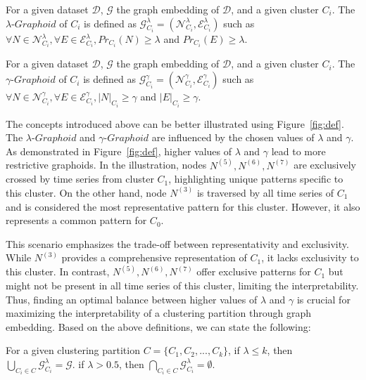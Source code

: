 \begin{definition}   
For a given dataset $\mathcal{D}$, $\mathcal{G}$ the graph embedding of $\mathcal{D}$, and a given cluster $C_i$. The $\lambda$-$Graphoid$ of $C_i$ is defined as $\mathcal{G}^{\lambda}_{C_i} = (\mathcal{N}^{\lambda}_{C_i},\mathcal{E}^{\lambda}_{C_i})$ such as $\forall N \in \mathcal{N}^{\lambda}_{C_i}, \forall E \in \mathcal{E}^{\lambda}_{C_i}, Pr_{C_i}(N) \geq \lambda$ and $Pr_{C_i}(E) \geq \lambda$.
\label{deflambdaGraph}  
\end{definition}

\begin{definition}   
For a given dataset $\mathcal{D}$, $\mathcal{G}$ the graph embedding of $\mathcal{D}$, and a given cluster $C_i$. The $\gamma$-$Graphoid$ of $C_i$ is defined as $\mathcal{G}^{\gamma}_{C_i} = (\mathcal{N}^{\gamma}_{C_i},\mathcal{E}^{\gamma}_{C_i})$ such as $\forall N \in \mathcal{N}^{\gamma}_{C_i}, \forall E \in \mathcal{E}^{\gamma}_{C_i}, |N|_{C_i} \geq \gamma$ and $|E|_{C_i} \geq \gamma$.
\label{defgammaGraph}  
\end{definition}

The concepts introduced above can be better illustrated using Figure~\ref{fig:def}. The $\lambda$-$Graphoid$ and $\gamma$-$Graphoid$ are influenced by the chosen values of $\lambda$ and $\gamma$. As demonstrated in Figure~\ref{fig:def}, higher values of $\lambda$ and $\gamma$ lead to more restrictive graphoids. In the illustration, nodes $N^{(5)},N^{(6)},N^{(7)}$ are exclusively crossed by time series from cluster $C_1$, highlighting unique patterns specific to this cluster. On the other hand, node $N^{(3)}$ is traversed by all time series of $C_1$ and is considered the most representative pattern for this cluster. However, it also represents a common pattern for $C_0$.

This scenario emphasizes the trade-off between representativity and exclusivity. While $N^{(3)}$ provides a comprehensive representation of $C_1$, it lacks exclusivity to this cluster. In contrast, $N^{(5)}, N^{(6)}, N^{(7)}$ offer exclusive patterns for $C_1$ but might not be present in all time series of this cluster, limiting the interpretability. Thus, finding an optimal balance between higher values of $\lambda$ and $\gamma$ is crucial for maximizing the interpretability of a clustering partition through graph embedding.
Based on the above definitions, we can state the following:

\begin{lemma}
    For a given clustering partition $C = \{C_1,C_2,...,C_k\}$, if $\lambda \leq k$, then $\bigcup_{C_i \in C} \mathcal{G}^{\lambda}_{C_i} = \mathcal{G}$.
    if $\lambda > 0.5$, then $\bigcap_{C_i \in C} \mathcal{G}^{\lambda}_{C_i} = \emptyset$.
    \label{Lemma1} 
\end{lemma} 

